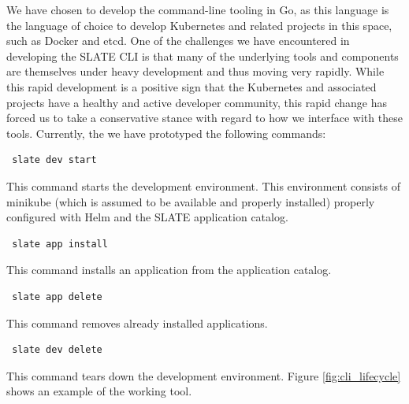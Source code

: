 \documentclass[sigconf]{acmart}
\begin{document}

We have chosen to develop the command-line tooling in Go\cite{Go}, as this language is the language of choice to develop Kubernetes and related projects in this space, such as Docker\cite{Docker} and etcd\cite{etcd}. One of the challenges we have encountered in developing the SLATE CLI is that many of the underlying tools and components are themselves under heavy development and thus moving very rapidly. While this rapid development is a positive sign that the Kubernetes and associated projects have a healthy and active developer community, this rapid change has forced us to take a conservative stance with regard to how we interface with these tools. Currently, the we have prototyped the following commands:
\begin{verbatim} slate dev start \end{verbatim} 
This command starts the development environment. This environment consists of minikube\cite{Minikube} (which is assumed to be available and properly installed) properly configured with Helm and the SLATE application catalog\cite{Slate-Catalog}.
\begin{verbatim} slate app install \end{verbatim}
This command installs an application from the application catalog.
\begin{verbatim} slate app delete \end{verbatim} 
This command removes already installed applications.
\begin{verbatim} slate dev delete \end{verbatim} 
This command tears down the development environment. Figure \ref{fig:cli_lifecycle} shows an example of the working tool.
\end{document}
